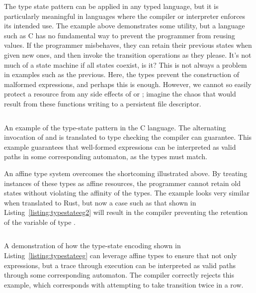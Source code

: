 The type state pattern can be applied in any typed language, but it is particularly meaningful in languages where the compiler or interpreter enforces its intended use. The example above demonstrates some utility, but a language such as C has no fundamental way to prevent the programmer from reusing values. 
If the programmer misbehaves, they can retain their previous states when given new ones, and then invoke the transition operations as they please. It's not much of a state machine if all states coexist, is it? This is not always a problem in examples such as the previous. Here, the types prevent the construction of malformed expressions, and perhaps this is enough. However, we cannot so easily protect a resource from any side effects of  or ; imagine the chaos that would result from these functions writing to a persistent file descriptor.
\begin{listing}[ht]
	\inputminted[linenos,tabsize=2,breaklines,frame=lines]{c}{typestate_eg.c}
	\caption[Type state automaton in C with expressions modeling runs.]{An example of the type-state pattern in the C language. The alternating invocation of  and  is translated to type checking the compiler can guarantee. This example guarantees that well-formed expressions can be interpreted as valid paths in some corresponding automaton, as the types must match.}
	\label{listing:typestateeg}
\end{listing}

An affine type system overcomes the shortcoming illustrated above. By treating instances of these types as affine resources, the programmer cannot retain old states without violating the affinity of the types. The example looks very similar when translated to Rust, but now a case such as that shown in Listing~\ref{listing:typestateeg2} will result in the compiler preventing the retention of the variable of type .

\begin{listing}[ht]
	\inputminted[]{rust}{typestate_eg2.rs}
	\caption[Type state automaton in Rust with execution traces as runs.]{A demonstration of how the type-state encoding shown in Listing~\ref{listing:typestateeg} can leverage affine types to ensure that not only expressions, but a trace through execution can be interpreted as valid paths through some corresponding automaton. The compiler correctly rejects this example, which corresponds with attempting to take transition  twice in a row.}
	\label{listing:typestateeg2}
\end{listing}

